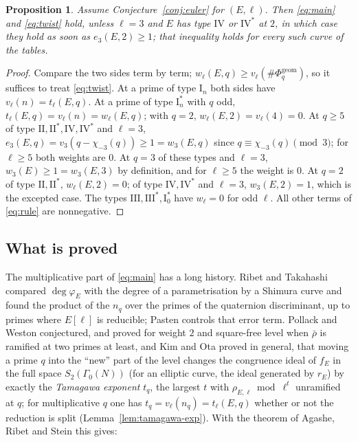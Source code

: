 \documentclass[11pt]{amsart}
\newtheorem{proposition}[theorem]{Proposition}
\theoremstyle{definition}
\newcommand{\degphi}{\deg\varphi_E}
\newcommand{\Phig}{\Phi^{\mathrm{geom}}}
\begin{document}
\begin{proposition}\label{prop:forms}
Assume Conjecture~\ref{conj:euler} for $(E,\ell)$. Then \eqref{eq:main} and \eqref{eq:twist} hold, unless $\ell=3$ and $E$ has type $\mathrm{IV}$ or $\mathrm{IV}^*$ at $2$, in which case they hold as soon as $e_3(E,2)\ge1$; that inequality holds for every such curve of the tables.
\end{proposition}
\begin{proof}
Compare the two sides term by term; $w_\ell(E,q)\ge v_\ell(\#\Phig_q)$, so it suffices to treat \eqref{eq:twist}. At a prime of type $\mathrm{I}_n$ both sides have $v_\ell(n)=t_\ell(E,q)$. At a prime of type $\mathrm{I}_n^*$ with $q$ odd, $t_\ell(E,q)=v_\ell(n)=w_\ell(E,q)$; with $q=2$, $w_\ell(E,2)=v_\ell(4)=0$. At $q\ge5$ of type $\mathrm{II},\mathrm{II}^*,\mathrm{IV},\mathrm{IV}^*$ and $\ell=3$, $e_3(E,q)=v_3(q-\chi_{-3}(q))\ge1=w_3(E,q)$ since $q\equiv\chi_{-3}(q)\pmod3$; for $\ell\ge5$ both weights are $0$. At $q=3$ of these types and $\ell=3$, $w_3(E)\ge1=w_3(E,3)$ by definition, and for $\ell\ge5$ the weight is $0$. At $q=2$ of type $\mathrm{II},\mathrm{II}^*$, $w_\ell(E,2)=0$; of type $\mathrm{IV},\mathrm{IV}^*$ and $\ell=3$, $w_3(E,2)=1$, which is the excepted case. The types $\mathrm{III},\mathrm{III}^*,\mathrm{I}_0^*$ have $w_\ell=0$ for odd $\ell$. All other terms of \eqref{eq:rule} are nonnegative.
\end{proof}

\subsection{What is proved}
The multiplicative part of \eqref{eq:main} has a long history. Ribet and Takahashi \cite{RibetTakahashi97,Takahashi01} compared $\degphi$ with the degree of a parametrisation by a Shimura curve and found the product of the $n_q$ over the primes of the quaternion discriminant, up to primes where $E[\ell]$ is reducible; Pasten \cite{Pasten} controls that error term. Pollack and Weston \cite{PollackWeston11} conjectured, and proved for weight $2$ and square-free level when $\bar\rho$ is ramified at two primes at least, and Kim and Ota \cite{KimOta} proved in general, that moving a prime $q$ into the ``new'' part of the level changes the congruence ideal of $f_E$ in the full space $S_2(\Gamma_0(N))$ (for an elliptic curve, the ideal generated by $r_E$) by exactly the \emph{Tamagawa exponent} $t_q$, the largest $t$ with $\rho_{E,\ell}\bmod\ell^t$ unramified at $q$; for multiplicative $q$ one has $t_q=v_\ell(n_q)=t_\ell(E,q)$ whether or not the reduction is split (Lemma~\ref{lem:tamagawa-exp}). With the theorem of Agashe, Ribet and Stein this gives:
\end{document}

